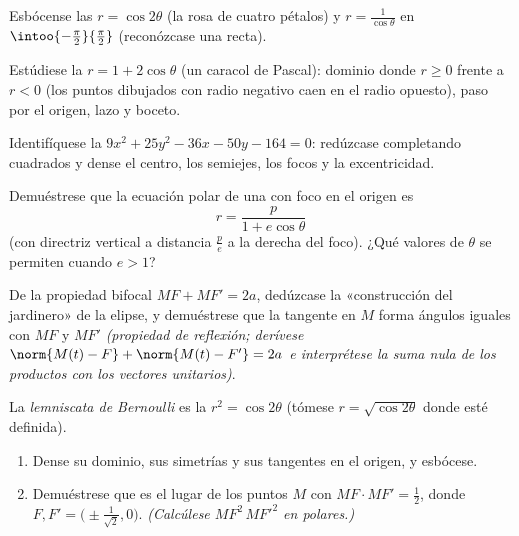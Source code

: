 \begin{exercise}[$\star$]\label{exo:b1:curves:4}
Esbócense las  $r = \cos 2\theta$ (la rosa de cuatro
pétalos) y $r = \frac{1}{\cos\theta}$ en
$\intoo{-\frac\pi2}{\frac\pi2}$ (reconózcase una recta).
\end{exercise}

\begin{exercise}[$\star\star$]\label{exo:b1:curves:5}
Estúdiese la  $r = 1 + 2\cos\theta$ (un caracol de
Pascal): dominio donde $r \geq 0$ frente a $r < 0$ (los puntos
dibujados con radio negativo caen en el radio opuesto), paso por el
origen, lazo  y boceto.
\end{exercise}

\begin{exercise}[$\star\star$]\label{exo:b1:curves:6}
Identifíquese la  $9x^2 + 25y^2 - 36x - 50y - 164 = 0$:
redúzcase completando cuadrados y dense el centro, los semiejes, los
focos y la excentricidad.
\end{exercise}

\begin{exercise}[$\star\star$]\label{exo:b1:curves:7}
Demuéstrese que la ecuación polar de una  con foco en el origen
es
\[
r = \frac{p}{1 + e\cos\theta}
\]
(con directriz vertical a distancia $\frac pe$ a la derecha del
foco). ¿Qué valores de $\theta$ se permiten cuando $e > 1$?
\end{exercise}

\begin{exercise}[$\star\star$]\label{exo:b1:curves:8}
De la propiedad bifocal $MF + MF' = 2a$, dedúzcase la «construcción
del jardinero» de la elipse, y demuéstrese que la tangente en $M$
forma ángulos iguales con $MF$ y $MF'$ \emph{(propiedad de reflexión;
derívese $\norm{M(t) - F} + \norm{M(t) - F'} = 2a$ e interprétese la
suma nula de los productos con los vectores unitarios)}.
\end{exercise}

\begin{exercise}[$\star\star\star$]\label{exo:b1:curves:9}
La \emph{lemniscata de Bernoulli} es la 
$r^2 = \cos 2\theta$ (tómese $r = \sqrt{\cos2\theta}$ donde esté
definida).
\begin{enumerate}
  \item Dense su dominio, sus simetrías y sus tangentes en el
        origen, y esbócese.
  \item Demuéstrese que es el lugar de los puntos $M$ con
        $MF \cdot MF' = \frac12$, donde
        $F, F' = \bigl(\pm\frac{1}{\sqrt2}, 0\bigr)$.
        \emph{(Calcúlese $MF^2\,MF'^2$ en  polares.)}
\end{enumerate}
\end{exercise}

